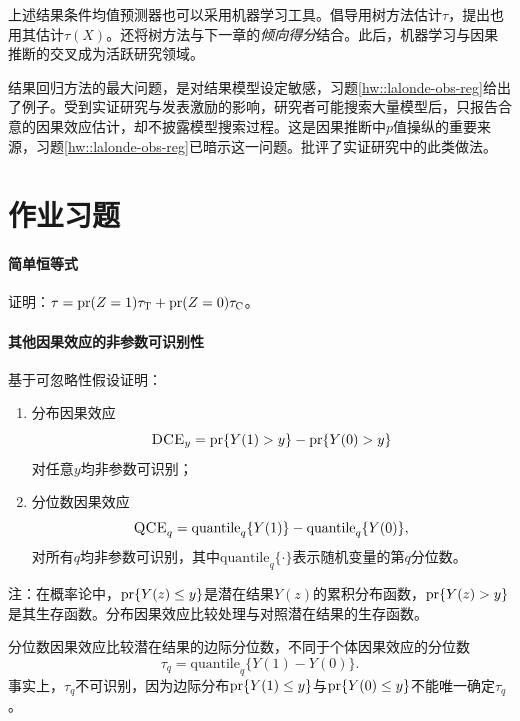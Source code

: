  

上述结果条件均值预测器也可以采用机器学习工具。\citet{hill2011bayesian}倡导用树方法估计$\tau$，\citet{wager2018estimation}提出也用其估计$\tau(X) $。\citet{wager2018estimation}还将树方法与下一章的{\it 倾向得分}结合。此后，机器学习与因果推断的交叉成为活跃研究领域\citep[e.g.,][]{hahn2020bayesian, kunzel2019metalearners}。 


结果回归方法的最大问题，是对结果模型设定敏感，习题\ref{hw::lalonde-obs-reg}给出了例子。受到实证研究与发表激励的影响，研究者可能搜索大量模型后，只报告合意的因果效应估计，却不披露模型搜索过程。这是因果推断中$p$值操纵的重要来源，习题\ref{hw::lalonde-obs-reg}已暗示这一问题。\citet{leamer1978specification}批评了实证研究中的此类做法。  

 


\section{作业习题}


\paragraph{简单恒等式}\label{hw::simple-identity-taus}

证明：$\tau = \textup{pr}(Z=1) \tau_\textsc{T} + \textup{pr}(Z=0)\tau_\textsc{C}$。 


\paragraph{其他因果效应的非参数可识别性}\label{hw::nonparametric-identification-dce-qce}

基于可忽略性假设证明：
\begin{enumerate}
\item
 分布因果效应
$$
\textsc{DCE}_y = \textup{pr}\{  Y(1) > y  \} - \textup{pr}\{ Y(0) > y \} 
$$
对任意$y$均非参数可识别；
\item
分位数因果效应
$$
\textsc{QCE}_q = \text{quantile}_q\{ Y(1) \} - \text{quantile}_q\{ Y(0) \},
$$
对所有$q$均非参数可识别，其中$\text{quantile}_q\{ \cdot \} $表示随机变量的第$q$分位数。 
\end{enumerate}



注：在概率论中，$\textup{pr}\{  Y(z) \leq y \}$是潜在结果$Y(z)$的累积分布函数，$\textup{pr}\{  Y(z) > y \}$是其生存函数。分布因果效应比较处理与对照潜在结果的生存函数。 
 
分位数因果效应比较潜在结果的边际分位数，不同于个体因果效应的分位数
$$
\tau_q =  \text{quantile}_q\{ Y(1)  - Y(0)\} .
$$
事实上，$\tau_q$不可识别，因为边际分布$\textup{pr}\{  Y(1) \leq  y  \} $与$ \textup{pr}\{ Y(0) \leq  y \} $不能唯一确定$\tau_q$。 


